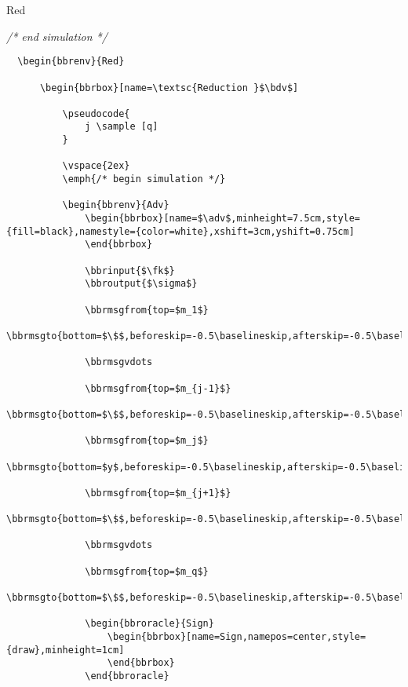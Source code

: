 \documentclass[a4paper]{report}
\begin{document}
\begin{bbrenv}{Red}
\begin{bbrbox}[name=\textsc{Reduction }$\bdv$]
		  \vspace{-3ex}
		  \emph{/* end simulation */}
		  
  
	  \end{bbrbox}
  \end{bbrenv}
  
  \begin{lstlisting}
  \begin{bbrenv}{Red}
  
	  \begin{bbrbox}[name=\textsc{Reduction }$\bdv$]
  
		  \pseudocode{
			  j \sample [q] 
		  }
		  
		  \vspace{2ex}
		  \emph{/* begin simulation */}
		  
		  \begin{bbrenv}{Adv}
			  \begin{bbrbox}[name=$\adv$,minheight=7.5cm,style={fill=black},namestyle={color=white},xshift=3cm,yshift=0.75cm]
			  \end{bbrbox}
  
			  \bbrinput{$\fk$}
			  \bbroutput{$\sigma$}			
			  
			  \bbrmsgfrom{top=$m_1$}
			  \bbrmsgto{bottom=$\$$,beforeskip=-0.5\baselineskip,afterskip=-0.5\baselineskip}
			  
			  \bbrmsgvdots
			  
			  \bbrmsgfrom{top=$m_{j-1}$}
			  \bbrmsgto{bottom=$\$$,beforeskip=-0.5\baselineskip,afterskip=-0.5\baselineskip}
			  
			  \bbrmsgfrom{top=$m_j$}
			  \bbrmsgto{bottom=$y$,beforeskip=-0.5\baselineskip,afterskip=-0.5\baselineskip}
  
			  \bbrmsgfrom{top=$m_{j+1}$}
			  \bbrmsgto{bottom=$\$$,beforeskip=-0.5\baselineskip,afterskip=-0.5\baselineskip}
  
			  \bbrmsgvdots
			  
			  \bbrmsgfrom{top=$m_q$}
			  \bbrmsgto{bottom=$\$$,beforeskip=-0.5\baselineskip,afterskip=-0.5\baselineskip}
  
			  \begin{bbroracle}{Sign}
				  \begin{bbrbox}[name=Sign,namepos=center,style={draw},minheight=1cm]
				  \end{bbrbox}
			  \end{bbroracle}
  

\end{lstlisting}
\end{document}
